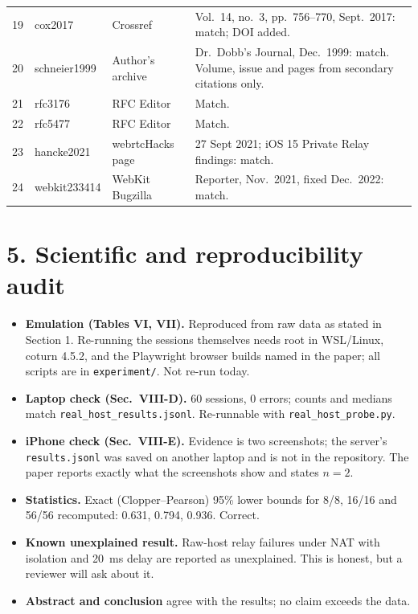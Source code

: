 \documentclass[10pt,a4paper]{article}
\begin{document}
\begin{longtable}{@{}L{0.6cm}L{2.6cm}L{3.6cm}L{8.6cm}@{}}
19 & cox2017 & Crossref & Vol.~14, no.~3, pp.~756--770, Sept.\ 2017: match; DOI added. \\
20 & schneier1999 & Author's archive & Dr.\ Dobb's Journal, Dec.\ 1999: match. Volume, issue and pages from secondary citations only. \\
21 & rfc3176 & RFC Editor & Match. \\
22 & rfc5477 & RFC Editor & Match. \\
23 & hancke2021 & webrtcHacks page & 27 Sept 2021; iOS 15 Private Relay findings: match. \\
24 & webkit233414 & WebKit Bugzilla & Reporter, Nov.\ 2021, fixed Dec.\ 2022: match. \\
\bottomrule
\end{longtable}
\normalsize

\section*{5. Scientific and reproducibility audit}
\begin{itemize}
\item \textbf{Emulation (Tables VI, VII).} Reproduced from raw data as stated in Section 1. Re-running the sessions themselves needs root in WSL/Linux, coturn 4.5.2, and the Playwright browser builds named in the paper; all scripts are in \texttt{experiment/}. Not re-run today.
\item \textbf{Laptop check (Sec.\ VIII-D).} 60 sessions, 0 errors; counts and medians match \texttt{real\_host\_results.jsonl}. Re-runnable with \texttt{real\_host\_probe.py}.
\item \textbf{iPhone check (Sec.\ VIII-E).} Evidence is two screenshots; the server's \texttt{results.jsonl} was saved on another laptop and is not in the repository. The paper reports exactly what the screenshots show and states $n=2$.
\item \textbf{Statistics.} Exact (Clopper--Pearson) 95\% lower bounds for 8/8, 16/16 and 56/56 recomputed: 0.631, 0.794, 0.936. Correct.
\item \textbf{Known unexplained result.} Raw-host relay failures under NAT with isolation and 20~ms delay are reported as unexplained. This is honest, but a reviewer will ask about it.
\item \textbf{Abstract and conclusion} agree with the results; no claim exceeds the data.
\end{itemize}
\end{document}
